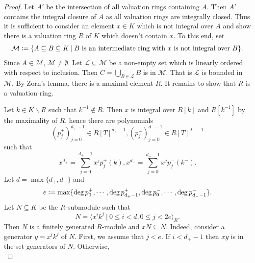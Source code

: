 \documentclass[10pt]{article}
\numberwithin{equation}{section}
\theoremstyle{definition}
\newcommand{\defeq}{\vcentcolon=}
\newcommand{\sep}[0]{\:|\:}
\begin{document}
\begin{proof}
    Let $A'$ be the intersection of all valuation rings containing $A$. Then $A'$ contains the integral closure of $A$ as all valuation rings are integrally closed. Thus it is sufficient to consider an element $x\in K$ which is not integral over $A$ and show there is a valuation ring $R$ of $K$ which doesn't contain $x$.
    To this end, set
    \begin{equation*}
        \mathcal{M}\defeq \{A\subseteq B\subseteq K\sep\text{$B$ is an intermediate ring with $x$ is not integral over $B$}\}.
    \end{equation*}
    Since $A\in\mathcal{M}$, $\mathcal{M}\not=\emptyset$. Let $\mathcal{L}\subseteq\mathcal{M}$ be a non-empty set which is linearly ordered with respect to inclusion. Then $C=\bigcup_{B\in\mathcal{L}}B$ is in $\mathcal{M}$. That is $\mathcal{L}$ is bounded in $\mathcal{M}$.
    By Zorn's lemma, there is a maximal element $R$. It remains to show that $R$ is a valuation ring.
    \par Let $k\in K\backslash R$ such that $k^{-1}\not\in R$. Then $x$ is integral over $R[k]$ and $R[k^{-1}]$ by the maximality of $R$, hence there are polynomials
    \begin{equation*}
        (p_j^+)_{j=0}^{d_+-1}\in R[T]^{d_+-1},(p_j^-)_{j=0}^{d_--1}\in R[T]^{d_--1}
    \end{equation*}
    such that
    \begin{equation*}
        x^{d_+} = \sum_{j=0}^{d_+-1}x^jp_j^{+}(k),x^{d_-} = \sum_{j=0}^{d_--1}x^jp_j^{-}(k^-).
    \end{equation*}
    Let $d = \max\{d_+,d_-\}$ and
    \begin{equation*}
        e \defeq \max\{\deg p_0^+,\cdots,\deg p_{d_+-1}^+,\deg p_0^-,\cdots,\deg p_{d_--1}^-\}.
    \end{equation*}
    Let $N\subseteq K$ be the $R$-submodule such that
    \begin{equation*}
        N = \langle x^ik^j\sep 0\leq i<d, 0\leq j<2e\rangle_R.
    \end{equation*}
     Then $N$ is a finitely generated $R$-module
    and $xN\subseteq N$. Indeed, consider a generator $y=x^ik^j$ of $N$. First, we assume that $j<e$. If $i<d_+-1$ then $xy$ is in the set generators of $N$. Otherwise,
    \begin{equation*}

\end{equation*}
\end{proof}
\end{document}
